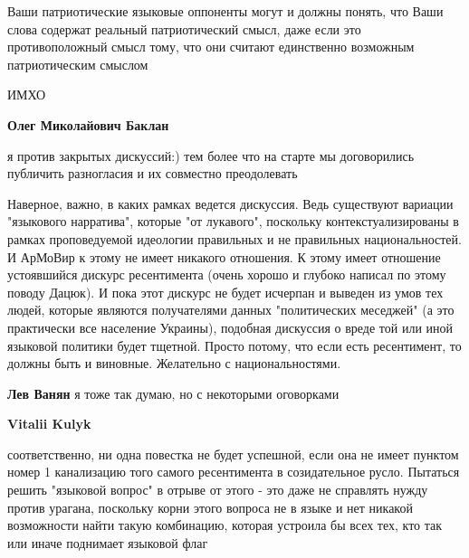 \begin{itemize}
\begin{itemize}
Ваши патриотические языковые оппоненты могут и должны понять, что Ваши слова
содержат реальный патриотический смысл, даже если это противоположный смысл
тому, что они считают единственно возможным патриотическим смыслом

ИМХО


\textbf{Олег Миколайович Баклан} 

я против закрытых дискуссий:) тем более что на старте мы договорились публичить
разногласия и их совместно преодолевать


Наверное, важно, в каких рамках ведется дискуссия. Ведь существуют вариации
"языкового нарратива", которые "от лукавого", поскольку контекстуализированы в
рамках проповедуемой идеологии правильных и не правильных национальностей. И
АрМоВир к этому не имеет никакого отношения. К этому имеет отношение
устоявшийся дискурс ресентимента (очень хорошо и глубоко написал по этому
поводу Дацюк). И пока этот дискурс не будет исчерпан и выведен из умов тех
людей, которые являются получателями данных "политических меседжей" (а это
практически все население Украины), подобная дискуссия о вреде той или иной
языковой политики будет тщетной. Просто потому, что если есть ресентимент, то
должны быть и виновные. Желательно с национальностями.

 
\textbf{Лев Ванян} я тоже так думаю, но с некоторыми оговорками

 
\textbf{Vitalii Kulyk} 

соответственно, ни одна повестка не будет успешной, если
она не имеет пунктом номер 1 канализацию того самого ресентимента в
созидательное русло. Пытаться решить "языковой вопрос" в отрыве от этого - это
даже не справлять нужду против урагана, поскольку корни этого вопроса не в
языке и нет никакой возможности найти такую комбинацию, которая устроила бы
всех тех, кто так или иначе поднимает языковой флаг


\end{itemize}
\end{itemize}
